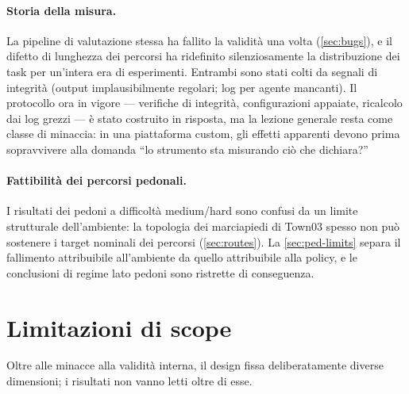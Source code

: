 \paragraph{Storia della misura.}
La pipeline di valutazione stessa ha fallito la validità una volta
(\cref{sec:bugs}), e il difetto di lunghezza dei percorsi ha
ridefinito silenziosamente la distribuzione dei task per un'intera era
di esperimenti. Entrambi sono stati colti da segnali di integrità
(output implausibilmente regolari; log per agente mancanti). Il
protocollo ora in vigore --- verifiche di integrità, configurazioni
appaiate, ricalcolo dai log grezzi --- è stato costruito in risposta,
ma la lezione generale resta come classe di minaccia: in una
piattaforma custom, gli effetti apparenti devono prima sopravvivere
alla domanda ``lo strumento sta misurando ciò che dichiara?''

\paragraph{Fattibilità dei percorsi pedonali.}
I risultati dei pedoni a difficoltà medium/hard sono confusi da un
limite strutturale dell'ambiente: la topologia dei marciapiedi di
Town03 spesso non può sostenere i target nominali dei percorsi
(\cref{sec:routes}). La \cref{sec:ped-limits} separa il fallimento
attribuibile all'ambiente da quello attribuibile alla policy, e le
conclusioni di regime lato pedoni sono ristrette di conseguenza.

\section{Limitazioni di scope}
\label{sec:scope}

Oltre alle minacce alla validità interna, il design fissa
deliberatamente diverse dimensioni; i risultati non vanno letti oltre
di esse.

